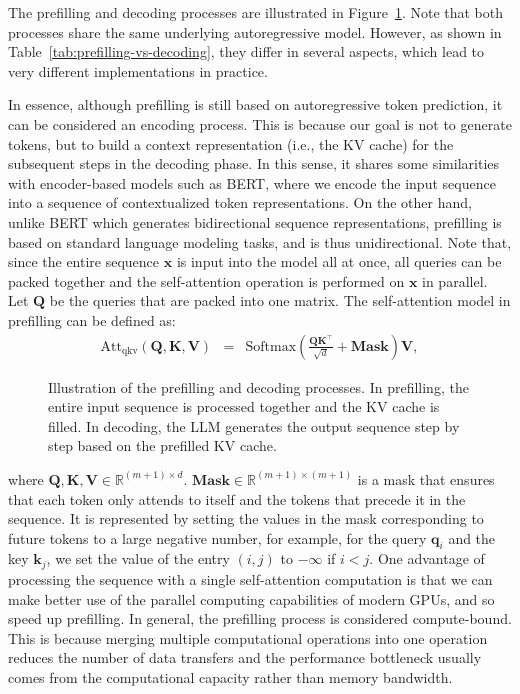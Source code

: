 The prefilling and decoding processes are illustrated in Figure~\ref{fig:prefilling-and-decoding}. Note that both processes share the same underlying autoregressive model. However, as shown in Table~\ref{tab:prefilling-vs-decoding}, they differ in several aspects, which lead to very different implementations in practice.

In essence, although prefilling is still based on autoregressive token prediction, it can be considered an encoding process. This is because our goal is not to generate tokens, but to build a context representation (i.e., the KV cache) for the subsequent steps in the decoding phase. In this sense, it shares some similarities with encoder-based models such as BERT, where we encode the input sequence into a sequence of contextualized token representations. On the other hand, unlike BERT which generates bidirectional sequence representations, prefilling is based on standard language modeling tasks, and is thus unidirectional. Note that, since the entire sequence $\mathbf{x}$ is input into the model all at once, all queries can be packed together and the self-attention operation is performed on $\mathbf{x}$ in parallel. Let $\mathbf{Q}$ be the queries that are packed into one matrix. The self-attention model in prefilling can be defined as:
\begin{eqnarray}
\mathrm{Att}_{\mathrm{qkv}}(\mathbf{Q},\mathbf{K},\mathbf{V}) & = & \mathrm{Softmax}(\frac{\mathbf{Q} \mathbf{K}^{\top}}{\sqrt{d}} + \mathbf{Mask}) \mathbf{V}, \label{eq:llm-prefilling-qkv-attention}
\end{eqnarray}

\begin{figure}[!t]
\centering

\vspace{-0.5cm} \caption{Illustration of the prefilling and decoding processes. In prefilling, the entire input sequence is processed together and the KV cache is filled. In decoding, the LLM generates the output sequence step by step based on the prefilled KV cache.}
\label{fig:prefilling-and-decoding}
\end{figure}

\noindent where $\mathbf{Q}, \mathbf{K}, \mathbf{V} \in \mathbb{R}^{(m+1) \times d}$. $\mathbf{Mask} \in \mathbb{R}^{(m+1) \times (m+1)}$ is a mask that ensures that each token only attends to itself and the tokens that precede it in the sequence. It is represented by setting the values in the mask corresponding to future tokens to a large negative number, for example, for the query $\mathbf{q}_{i}$ and the key $\mathbf{k}_{j}$, we set the value of the entry $(i,j)$ to $-\infty$ if $i < j$. One advantage of processing the sequence with a single self-attention computation is that we can make better use of the parallel computing capabilities of modern GPUs, and so speed up prefilling. In general, the prefilling process is considered compute-bound. This is because merging multiple computational operations into one operation reduces the number of data transfers and the performance bottleneck usually comes from the computational capacity rather than memory bandwidth.

